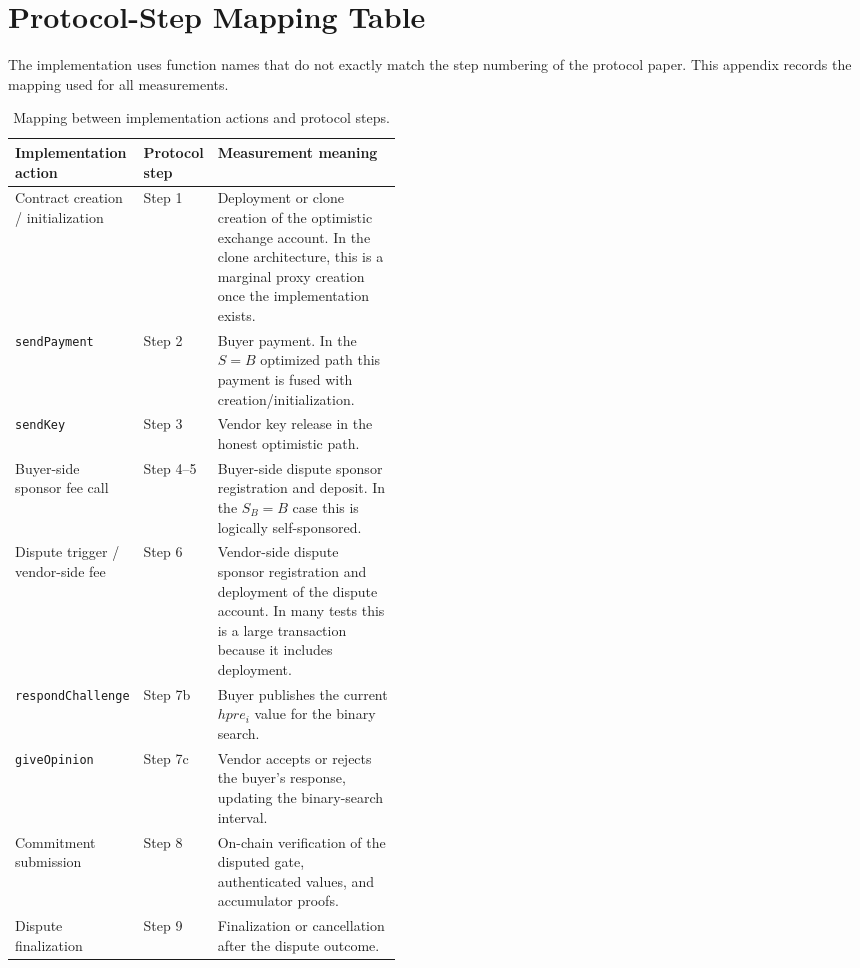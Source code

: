 \chapter{Protocol-Step Mapping Table}
\label{app:protocol-step-mapping}

The implementation uses function names that do not exactly match the step numbering of the
protocol paper. This appendix records the mapping used for all measurements.

\begin{table}[htbp]
  \centering
  \small
  \begin{tabularx}{\linewidth}{>{\raggedright\arraybackslash}p{0.27\linewidth}>{\raggedright\arraybackslash}p{0.18\linewidth}>{\raggedright\arraybackslash}X}
    \toprule
    Implementation action & Protocol step & Measurement meaning \\
    \midrule
    Contract creation / initialization & Step 1 & Deployment or clone creation of the
    optimistic exchange account. In the clone architecture, this is a marginal proxy
    creation once the implementation exists. \\
    \texttt{sendPayment} & Step 2 & Buyer payment. In the \(S=B\) optimized path this
    payment is fused with creation/initialization. \\
    \texttt{sendKey} & Step 3 & Vendor key release in the honest optimistic path. \\
    Buyer-side sponsor fee call & Step 4--5 & Buyer-side dispute sponsor
    registration and deposit. In the \(S_B=B\) case this is logically self-sponsored. \\
    Dispute trigger / vendor-side fee & Step 6 & Vendor-side dispute
    sponsor registration and deployment of the dispute account. In many tests this is a
    large transaction because it includes deployment. \\
    \texttt{respondChallenge} & Step 7b & Buyer publishes the current \(hpre_i\) value for
    the binary search. \\
    \texttt{giveOpinion} & Step 7c & Vendor accepts or rejects the buyer's response,
    updating the binary-search interval. \\
    Commitment submission & Step 8 & On-chain
    verification of the disputed gate, authenticated values, and accumulator proofs. \\
    Dispute finalization & Step 9 & Finalization or
    cancellation after the dispute outcome. \\
    \bottomrule
  \end{tabularx}
  \caption{Mapping between implementation actions and protocol steps.}
  \label{tab:app-step-mapping}
\end{table}

